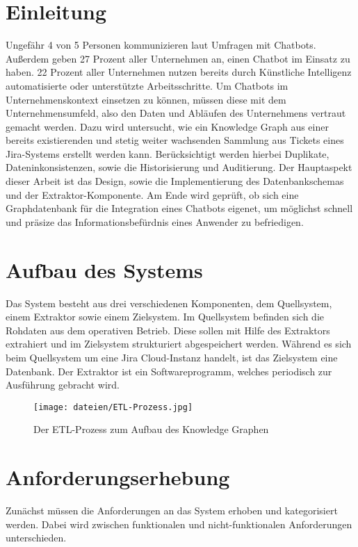 \documentclass[10pt]{article}
\begin{document}
\section{Einleitung}
Ungefähr 4 von 5 Personen kommunizieren laut Umfragen mit Chatbots. Außerdem geben 27 Prozent aller Unternehmen an, einen Chatbot im Einsatz zu haben. 22 Prozent aller Unternehmen nutzen bereits durch Künstliche Intelligenz automatisierte oder unterstützte Arbeitsschritte. Um Chatbots im Unternehmenskontext einsetzen zu können, müssen diese mit dem Unternehmensumfeld, also den Daten und Abläufen des Unternehmens vertraut gemacht werden. Dazu wird untersucht, wie ein Knowledge Graph aus einer bereits existierenden und stetig weiter wachsenden Sammlung aus Tickets eines Jira-Systems erstellt werden kann. Berücksichtigt werden hierbei Duplikate, Dateninkonsistenzen, sowie die Historisierung und Auditierung. Der Hauptaspekt dieser Arbeit ist das Design, sowie die Implementierung des Datenbankschemas und der Extraktor-Komponente. Am Ende wird geprüft, ob sich eine Graphdatenbank für die Integration eines Chatbots eigenet, um möglichst schnell und präsize das Informationsbefürdnis eines Anwender zu befriedigen.
\section{Aufbau des Systems}
Das System besteht aus drei verschiedenen Komponenten, dem Quellsystem, einem Extraktor sowie einem Zielsystem. Im Quellsystem befinden sich die Rohdaten aus dem operativen Betrieb. Diese sollen mit Hilfe des Extraktors extrahiert und im Zielsystem strukturiert abgespeichert werden. Während es sich beim Quellsystem um eine Jira Cloud-Instanz handelt, ist das Zielsystem eine Datenbank. Der Extraktor ist ein Softwareprogramm, welches periodisch zur Ausführung gebracht wird.
\begin{figure}[h]
\centering
\texttt{[image: dateien/ETL-Prozess.jpg]}
\caption{Der ETL-Prozess zum Aufbau des Knowledge Graphen}
\label{fig:meine-grafik}
\end{figure}
\section{Anforderungserhebung}
Zunächst müssen die Anforderungen an das System erhoben und kategorisiert werden. Dabei wird zwischen funktionalen und nicht-funktionalen Anforderungen unterschieden.
\end{document}
